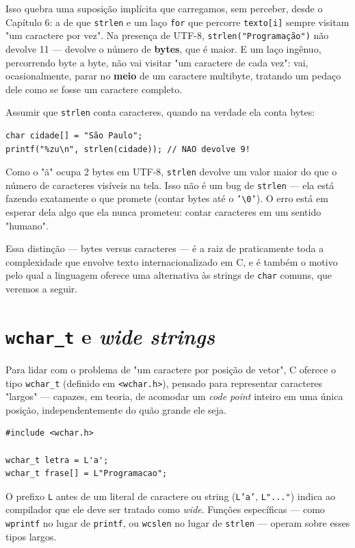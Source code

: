 Isso quebra uma suposição implícita que carregamos, sem perceber, desde o Capítulo 6: a de que \texttt{strlen} e um laço \texttt{for} que percorre \texttt{texto[i]} sempre visitam "um caractere por vez". Na presença de UTF-8, \texttt{strlen("Programação")} não devolve 11 — devolve o número de \textbf{bytes}, que é maior. E um laço ingênuo, percorrendo byte a byte, não vai visitar "um caractere de cada vez": vai, ocasionalmente, parar no \textbf{meio} de um caractere multibyte, tratando um pedaço dele como se fosse um caractere completo.

\begin{errocomum}
Assumir que \texttt{strlen} conta caracteres, quando na verdade ela conta bytes:
\begin{lstlisting}
char cidade[] = "São Paulo";
printf("%zu\n", strlen(cidade)); // NAO devolve 9!
\end{lstlisting}
Como o "ã" ocupa 2 bytes em UTF-8, \texttt{strlen} devolve um valor maior do que o número de caracteres visíveis na tela. Isso não é um bug de \texttt{strlen} — ela está fazendo exatamente o que promete (contar bytes até o \texttt{'\textbackslash 0'}). O erro está em esperar dela algo que ela nunca prometeu: contar caracteres em um sentido "humano".
\end{errocomum}

Essa distinção — bytes versus caracteres — é a raiz de praticamente toda a complexidade que envolve texto internacionalizado em C, e é também o motivo pelo qual a linguagem oferece uma alternativa às strings de \texttt{char} comuns, que veremos a seguir.

\section*{\texttt{wchar\_t} e \textit{wide strings}}

Para lidar com o problema de "um caractere por posição de vetor", C oferece o tipo \texttt{wchar\_t} (definido em \texttt{<wchar.h>}), pensado para representar caracteres "largos" — capazes, em teoria, de acomodar um \textit{code point} inteiro em uma única posição, independentemente do quão grande ele seja.

\begin{lstlisting}
#include <wchar.h>

wchar_t letra = L'a';
wchar_t frase[] = L"Programacao";
\end{lstlisting}

O prefixo \texttt{L} antes de um literal de caractere ou string (\texttt{L'a'}, \texttt{L"..."}) indica ao compilador que ele deve ser tratado como \textit{wide}. Funções específicas — como \texttt{wprintf} no lugar de \texttt{printf}, ou \texttt{wcslen} no lugar de \texttt{strlen} — operam sobre esses tipos largos.

